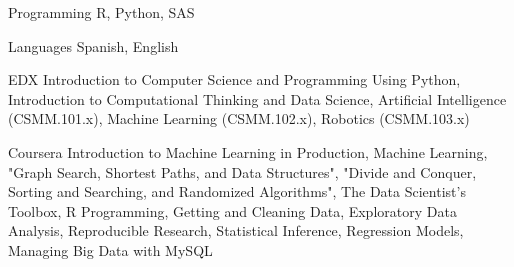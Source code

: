 

\begin{cvskills}




  \cvskill
    {Programming} %
    {R, Python, SAS} %

  \cvskill
    {Languages} %
    {Spanish, English} %

  \cvskill
    {EDX} %
    {Introduction to Computer Science and Programming Using Python, Introduction to Computational Thinking and Data Science, Artificial Intelligence (CSMM.101.x), Machine Learning (CSMM.102.x), Robotics (CSMM.103.x)} %

  \cvskill
    {Coursera} %
    {Introduction to Machine Learning in Production, Machine Learning, "Graph Search, Shortest Paths, and Data Structures", "Divide and Conquer, Sorting and Searching, and Randomized Algorithms", The Data Scientist's Toolbox, R Programming, Getting and Cleaning Data, Exploratory Data Analysis, Reproducible Research, Statistical Inference, Regression Models, Managing Big Data with MySQL} %
    
\end{cvskills}
